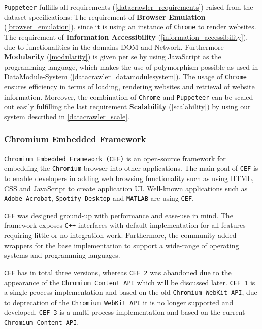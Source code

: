 \texttt{Puppeteer} fulfills all requirements (\ref{datacrawler_requirements}) raised from the dataset specifications:
The requirement of \textbf{Browser Emulation} (\ref{browser_emulation}), since it is using an instance of \texttt{Chrome} to render websites. The requirement of \textbf{Information Accessibility} (\ref{information_accessibility}), due to functionalities in the domains DOM and Network. Furthermore \textbf{Modularity} (\ref{modularity}) is given per se by using JavaScript as the programming language, which makes the use of polymorphism possible as used in DataModule-System (\ref{datacrawler_datamodulesystem}). The usage of \texttt{Chrome} ensures efficiency in terms of loading, rendering websites and retrieval of website information. Moreover, the combination of \texttt{Chrome} and \texttt{Puppeteer} can be scaled-out easily fulfilling the last requirement \textbf{Scalability} (\ref{scalability}) by using our system described in \ref{datacrawler_scale}.

\subsubsection{Chromium Embedded Framework}
\texttt{Chromium Embedded Framework (CEF)} is an open-source framework for embedding the \texttt{Chromium} browser into other applications. The main goal of \texttt{CEF} is to enable developers in adding web browsing functionality such as using HTML, CSS and JavaScript to create application UI. Well-known applications such as \texttt{Adobe Acrobat}, \texttt{Spotify Desktop} and \texttt{MATLAB} are using \texttt{CEF}.

\texttt{CEF} was designed ground-up with performance and ease-use in mind. The framework exposes \texttt{C++} interfaces with default implementation for all features requiring little or no integration work. Furthermore, the community added wrappers for the base implementation to support a wide-range of operating systems and programming languages.

\texttt{CEF} has in total three versions, whereas \texttt{CEF 2} was abandoned due to the appearance of the \texttt{Chromium Content API} which will be discussed later. \texttt{CEF 1} is a single process implementation and based on the old \texttt{Chromium WebKit API}, due to deprecation of the \texttt{Chromium WebKit API} it is no longer supported and developed. \texttt{CEF 3} is a multi process implementation and based on the current \texttt{Chromium Content API}.

